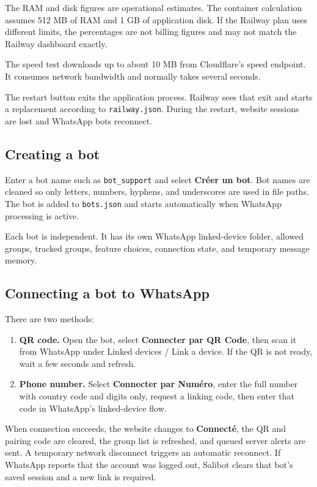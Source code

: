 \documentclass[11pt,a4paper]{article}
\begin{document}
The RAM and disk figures are operational estimates. The container calculation assumes 512 MB of RAM and 1 GB of application disk. If the Railway plan uses different limits, the percentages are not billing figures and may not match the Railway dashboard exactly.

The speed test downloads up to about 10 MB from Cloudflare's speed endpoint. It consumes network bandwidth and normally takes several seconds.

The restart button exits the application process. Railway sees that exit and starts a replacement according to \texttt{railway.json}. During the restart, website sessions are lost and WhatsApp bots reconnect.

\subsection{Creating a bot}

Enter a bot name such as \texttt{bot\_support} and select \textbf{Créer un bot}. Bot names are cleaned so only letters, numbers, hyphens, and underscores are used in file paths. The bot is added to \texttt{bots.json} and starts automatically when WhatsApp processing is active.

Each bot is independent. It has its own WhatsApp linked-device folder, allowed groups, tracked groups, feature choices, connection state, and temporary message memory.

\subsection{Connecting a bot to WhatsApp}

There are two methods:

\begin{enumerate}
  \item \textbf{QR code.} Open the bot, select \textbf{Connecter par QR Code}, then scan it from WhatsApp under Linked devices / Link a device. If the QR is not ready, wait a few seconds and refresh.
  \item \textbf{Phone number.} Select \textbf{Connecter par Numéro}, enter the full number with country code and digits only, request a linking code, then enter that code in WhatsApp's linked-device flow.
\end{enumerate}

When connection succeeds, the website changes to \textbf{Connecté}, the QR and pairing code are cleared, the group list is refreshed, and queued server alerts are sent. A temporary network disconnect triggers an automatic reconnect. If WhatsApp reports that the account was logged out, Salibot clears that bot's saved session and a new link is required.
\end{document}
